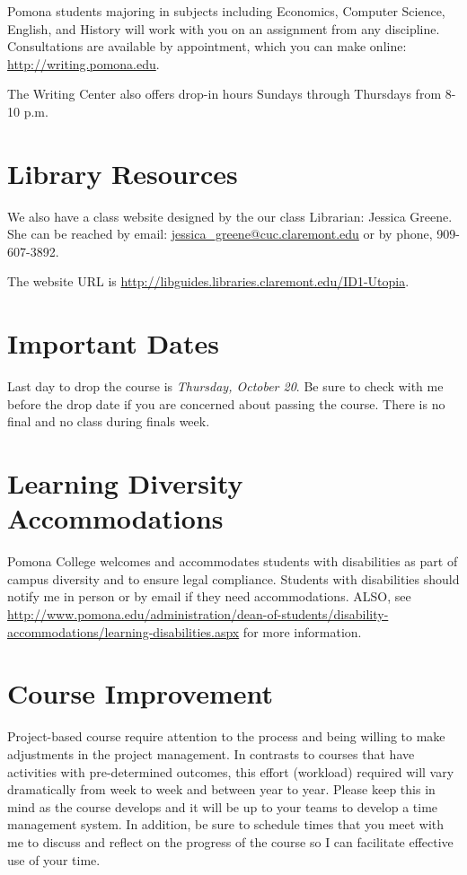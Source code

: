 Pomona students majoring in subjects including Economics, Computer Science, English, and History will work with you on an assignment from any discipline. Consultations are available by appointment, which you can make online: \url{http://writing.pomona.edu}.

The Writing Center also offers drop-in hours Sundays through Thursdays from 8-10 p.m.

\section{Library Resources}

We also have a class website designed by the our class Librarian: Jessica Greene. She can be reached by email: \url{jessica_greene@cuc.claremont.edu} or by phone, 909-607-3892.

The website URL is \url{http://libguides.libraries.claremont.edu/ID1-Utopia}.

\section{Important Dates} 
Last day  to drop the course is \emph{Thursday, October 20}. Be sure to check with me before the drop date if you are concerned about passing the course. There is no final and no class during finals week. 

\section{Learning Diversity Accommodations} 

Pomona College welcomes and accommodates students with disabilities as part of campus diversity and to ensure legal compliance. Students with disabilities should notify me in person or by email if they need accommodations. ALSO, see \url{http://www.pomona.edu/administration/dean-of-students/disability-accommodations/learning-disabilities.aspx} for more information.

\section{Course Improvement}
Project-based course require attention to the process and being willing to make adjustments in the project management. In contrasts to courses that have activities with pre-determined outcomes, this effort (workload) required will vary dramatically from week to week and between year to year. Please keep this in mind as the course develops and it will be up to your teams to develop a time management system. In addition, be sure to schedule times that you meet with me to discuss and reflect on the progress of the course so I can facilitate effective use of your time.


